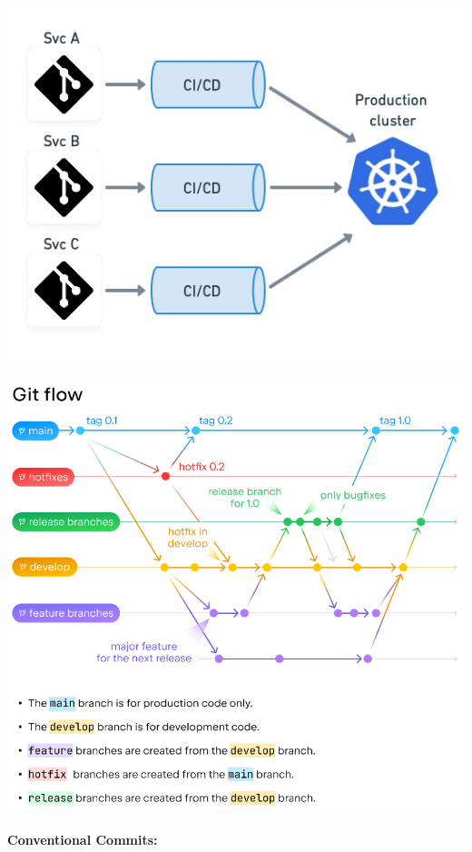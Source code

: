 \includegraphics[width=\textwidth]{./methodology/src/assets/microdeployment.jpg}

\includegraphics[width=\textwidth]{./methodology/src/assets/gitflow.png}

\hypertarget{conventionalcommits}{
\paragraph{Conventional Commits:}\label{conventionalcommits}}

